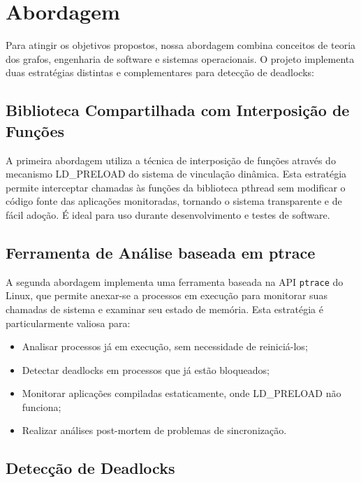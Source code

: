 \section{Abordagem}\label{sec:abordagem}

Para atingir os objetivos propostos, nossa abordagem combina conceitos de teoria dos grafos, engenharia de software e sistemas operacionais. O projeto implementa duas estratégias distintas e complementares para detecção de deadlocks:

\subsection{Biblioteca Compartilhada com Interposição de Funções}

A primeira abordagem utiliza a técnica de interposição de funções através do mecanismo LD\_PRELOAD do sistema de vinculação dinâmica. Esta estratégia permite interceptar chamadas às funções da biblioteca pthread sem modificar o código fonte das aplicações monitoradas, tornando o sistema transparente e de fácil adoção. É ideal para uso durante desenvolvimento e testes de software.

\subsection{Ferramenta de Análise baseada em ptrace}

A segunda abordagem implementa uma ferramenta baseada na API \texttt{ptrace} do Linux, que permite anexar-se a processos em execução para monitorar suas chamadas de sistema e examinar seu estado de memória. Esta estratégia é particularmente valiosa para:

\begin{itemize}
    \item Analisar processos já em execução, sem necessidade de reiniciá-los;
    \item Detectar deadlocks em processos que já estão bloqueados;
    \item Monitorar aplicações compiladas estaticamente, onde LD\_PRELOAD não funciona;
    \item Realizar análises post-mortem de problemas de sincronização.
\end{itemize}

\subsection{Detecção de Deadlocks}

